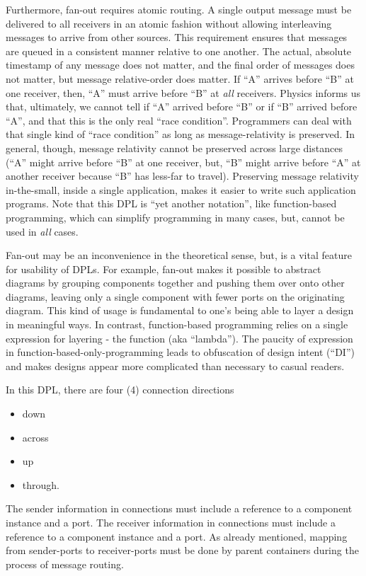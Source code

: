 \documentclass[10pt,anonymous,review]{acmart}
\begin{document}
Furthermore, fan-out requires atomic routing. A single output message must be delivered to all receivers in an atomic fashion without allowing interleaving messages to arrive from other sources. This requirement ensures that messages are queued in a consistent manner relative to one another. The actual, absolute timestamp of any message does not matter, and the final order of messages does not matter, but message relative-order does matter. If “A” arrives before “B” at one receiver, then, “A” must arrive before “B” at \emph{all} receivers. Physics informs us that, ultimately, we cannot tell if “A” arrived before “B” or if “B” arrived before “A”, and that this is the only real “race condition”. Programmers can deal with that single kind of “race condition” as long as message-relativity is preserved. In general, though, message relativity cannot be preserved across large distances (“A” might arrive before “B” at one receiver, but, “B” might arrive before “A” at another receiver because “B” has less-far to travel). Preserving message relativity in-the-small, inside a single application, makes it easier to write such application programs. Note that this DPL is “yet another notation”, like function-based programming, which can simplify programming in many cases, but, cannot be used in \emph{all} cases.

Fan-out may be an inconvenience in the theoretical sense, but, is a vital feature for usability of DPLs. For example, fan-out makes it possible to abstract diagrams by grouping components together and pushing them over onto other diagrams, leaving only a single component with fewer ports on the originating diagram. This kind of usage is fundamental to one’s being able to layer a design in meaningful ways. In contrast, function-based programming relies on a single expression for layering - the function (aka “lambda”). The paucity of expression in function-based-only-programming leads to obfuscation of design intent (“DI”) and makes designs appear more complicated than necessary to casual readers.



In this DPL, there are four (4) connection directions
\begin{itemize}
\item down
\item across
\item up
\item through.
\end{itemize}
The sender information in connections must include a reference to a component instance and a port.
The receiver information in connections must include a reference to a component instance and a port.
As already mentioned, mapping from sender-ports to receiver-ports must be done by parent containers during the process of message routing.
\end{document}
